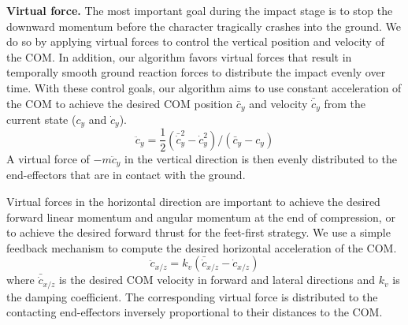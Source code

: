 \textbf{Virtual force.} The most important goal during the impact
stage is to stop the downward momentum before the character tragically
crashes into the ground. We do so by applying virtual forces to
control the vertical position and velocity of the COM. In addition,
our algorithm favors virtual forces that result in temporally smooth
ground reaction forces to distribute the impact evenly over
time.  With these control goals, our algorithm aims to
use constant acceleration of the COM to achieve the desired COM
position $\bar{c}_y$ and velocity $\bar{\dot{c}}_y$ from the current
state ($c_y$ and $\dot{c}_y$).
\begin{equation}
\label{eqn:landing_controlY}
\ddot{c}_y = \frac{1}{2}(\bar{\dot{c}}_y^2 - \dot{c}_y^2) / (\bar{c}_y-c_y)
\end{equation}
A virtual force of $-m\ddot{c}_y$ in the vertical direction is then evenly
distributed to the end-effectors that are in contact with the ground.

Virtual forces in the horizontal direction are important to achieve
the desired forward linear momentum and angular momentum at the end of 
compression, or to achieve the desired forward thrust for the feet-first
strategy. We use a simple feedback mechanism to compute the desired
horizontal acceleration of the COM.
\begin{equation}
\label{eqn:landing_controlXZ}
\ddot{c}_{x/z} = k_v (\bar{\dot{c}}_{x/z} - \dot{c}_{x/z})
\end{equation}
where $\bar{\dot{c}}_{x/z}$ is the desired COM velocity in forward and
lateral directions and $k_v$ is the damping coefficient. The
corresponding virtual force is distributed to the contacting
end-effectors inversely proportional to their distances to the
COM.

